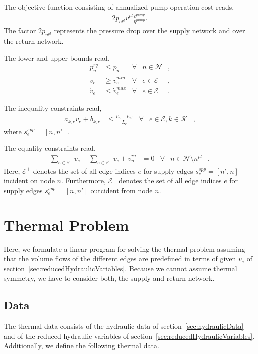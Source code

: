 \documentclass[a4paper,10pt]{article}
\begin{document}
The objective function consisting of annualized pump operation cost reads,
\begin{align}
2 p_{n^{pl}} \dot{v}^{pl}\frac{c^{pump}}{\eta^{pump}}.
\end{align}
The factor $2 p_{n^{pl}}$ represents the pressure drop over the supply network and over the return network.

The lower and upper bounds read,
\begin{align}
 p_n^{rq}   &\le p_{n}          &\forall& n\in\mathcal{N} &,\\
 \dot{v}_{e}&\ge \dot{v}_e^{min}&\forall& e\in\mathcal{E} &,\\
 \dot{v}_{e}&\le \dot{v}_e^{max}&\forall& e\in\mathcal{E} &.
\end{align}

The inequality constraints read,
\begin{align}
 a_{k,e}\dot{v}_{e} +b_{k,e} &\le \frac{p_{n}-p_{n'}}{L_e}&\forall& e\in\mathcal{E},k\in\mathcal{K}&,
\end{align}
where $s_e^{spp}=[n,n']$.

The equality constraints read,
\begin{align}
 \sum_{e\in \mathcal{E}^+} \dot{v}_{e} - \sum_{e\in \mathcal{E}^-} \dot{v}_{e} + \dot{v}_n^{rq}&= 0&\forall& n\in\mathcal{N}\setminus n^{pl} &.
\end{align}
Here, $\mathcal{E}^+$ denotes the set of all edge indices $e$ for supply edges $s_e^{spp}=[n',n]$ incident on node $n$.
Furthermore, $\mathcal{E}^-$ denotes the set of all edge indices $e$ for supply edges $s_e^{spp}=[n,n']$ outcident from node $n$.



\section{Thermal Problem}

Here, we formulate a linear program for solving the thermal problem assuming that the volume flows of the different edges are predefined in terms of given $\dot{v}_e$ of section~\ref{sec:reducedHydraulicVariables}.
Because we cannot assume thermal symmetry, we have to consider both, the supply and return network.

\subsection{Data}

The thermal data consists of the hydraulic data of section~\ref{sec:hydraulicData} and of the reduced hydraulic variables of section~\ref{sec:reducedHydraulicVariables}.
Additionally, we define the following thermal data.
\end{document}
